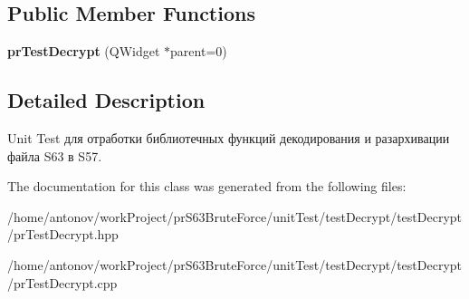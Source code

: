 \subsection*{Public Member Functions}
\begin{DoxyCompactItemize}
\item 
\mbox{\label{classunit_test_1_1pr_test_decrypt_a065b5a9ae228400c52f5498fb38ef3ad}} 
{\bfseries pr\+Test\+Decrypt} (Q\+Widget $\ast$parent=0)
\end{DoxyCompactItemize}


\subsection{Detailed Description}
Unit Test для отработки библиотечных функций декодирования и разархивации файла S63 в S57. 

The documentation for this class was generated from the following files\+:\begin{DoxyCompactItemize}
\item 
/home/antonov/work\+Project/pr\+S63\+Brute\+Force/unit\+Test/test\+Decrypt/test\+Decrypt/pr\+Test\+Decrypt.\+hpp\item 
/home/antonov/work\+Project/pr\+S63\+Brute\+Force/unit\+Test/test\+Decrypt/test\+Decrypt/pr\+Test\+Decrypt.\+cpp\end{DoxyCompactItemize}
